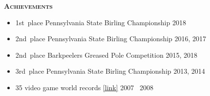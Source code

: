 \documentclass{article}
\newcommand{\mysection}[1]{\vspace{0.5cm}
\hspace{-1.3cm}\textsc{\textbf{#1}}~\hrulefill}
\begin{document}
\mysection{Achievements}

\begin{itemize}
\item 1st~place Pennsylvania State Birling Championship \hfill 2018
\item 2nd~place Pennsylvania State Birling Championship \hfill 2016, 2017
\item 2nd~place Barkpeelers Greased Pole Competition \hfill 2015, 2018
\item 3rd~place Pennsylvania State Birling Championship \hfill 2013, 2014
\item 35 video game world records \href{https://www.twingalaxies.com/scores.php?player=43761}{[link]} \hfill 2007 \textendash\ 2008
\end{itemize}
\end{document}
